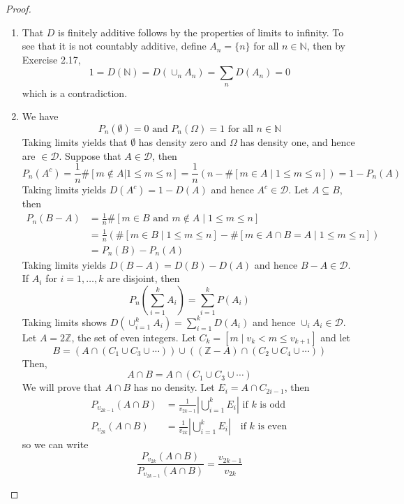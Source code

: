 \documentclass[11pt]{article}
\newcommand{\N}{\mathbb{N}}
\newcommand{\Z}{\mathbb{Z}}
\newcommand{\seq}{\subseteq}
\newcommand{\Om}{\Omega}
\newcommand{\es}{\emptyset}
\newcommand{\mc}{\mathcal}
\newcommand{\un}{\cup}
\newcommand{\ic}{\cap}
\newcommand{\Sum}{\sum\limits}
\newcommand{\abs}[1]{\left\lvert#1\right\rvert}
\begin{document}
\begin{proof}
    \begin{enumerate}
        \item That $D$ is finitely additive follows by the properties of limits to infinity. To see that it is not countably additive, define $A_n = \{ n \}$ for all $n \in \N$, then by Exercise 2.17,
        \[ 1 = D (\N) = D \left ( \cup_{n} A_n \right) = \Sum_{n} D(A_n) = 0 \]
        which is a contradiction.
        \item We have
        \[ P_n (\es) = 0 \text { and } P_n (\Om) = 1 \text { for all } n \in \N  \]
        Taking limits yields that $\es$ has density zero and $\Om$ has density one, and hence are $\in \mc{D}$. Suppose that $A \in \mc D$, then
        \[ P_n (A^{c}) = \frac{1}{n} \#[m \notin A | 1 \leq m \leq n] = \frac{1}{n} (n - \#[m \in A \mid 1 \leq m \leq n]) = 1 - P_n(A) \]
        Taking limits yields $D(A^{c}) = 1 - D(A)$ and hence $A^c \in \mc{D}$. Let $A \seq B$, then
        \begin{align*}
            P_n (B-A) &= \frac{1}{n} \#[m \in B \text { and } m \notin A \mid 1 \leq m \leq n] \\
            &= \frac{1}{n} (\#[m \in B \mid 1 \leq m \leq n] - \#[m \in A \ic B = A \mid 1 \leq m \leq n]) \\
            &= P_n (B) - P_n(A)
        \end{align*}
        Taking limits yields $D(B-A) = D(B) - D(A)$ and hence $B-A \in \mc{D}$. If $A_i$ for $i = 1, \ldots, k$ are disjoint, then
        \[ P_n (\sum_{i=1}^{k} A_i) = \sum_{i=1}^{k} P(A_i) \]
        Taking limits shows $D(\cup_{i=1}^{k} A_i) = \sum_{i=1}^{k} D(A_i)$ and hence $\cup_i A_i \in \mc{D}$. Let $A = 2 \Z$, the set of even integers. Let $C_k = [m \mid v_k < m \leq v_{k+1}]$ and let 
        \[ B = (A \ic (C_1 \un C_3 \un \cdots)) \un ((\Z - A) \ic (C_2 \un C_4 \un \cdots)) \]
        Then,
        \[ A \ic B = A \ic (C_1 \un C_3 \un \cdots) \]
        We will prove that $A \ic B$ has no density. Let $E_{i} = A \ic C_{2i - 1}$, then
        \begin{align*}
            P_{v_{2k-1}} (A \ic B) &= \frac{1}{v_{2k-1}} \abs{\bigcup_{i=1}^{k} E_i} \text { if $k$ is odd } \\
            P_{v_{2k}} (A \ic B) &= \frac{1}{v_{2k}} \abs{\bigcup_{i=1}^{k} E_i} \ \ \  \text { if $k$ is even}
        \end{align*}
        so we can write
        \[ \frac{P_{v_{2k}} (A \ic B)}{P_{v_{2k-1}} (A \ic B)} = \frac{v_{2k-1}}{v_{2k}} \]

\end{enumerate}
\end{proof}
\end{document}
